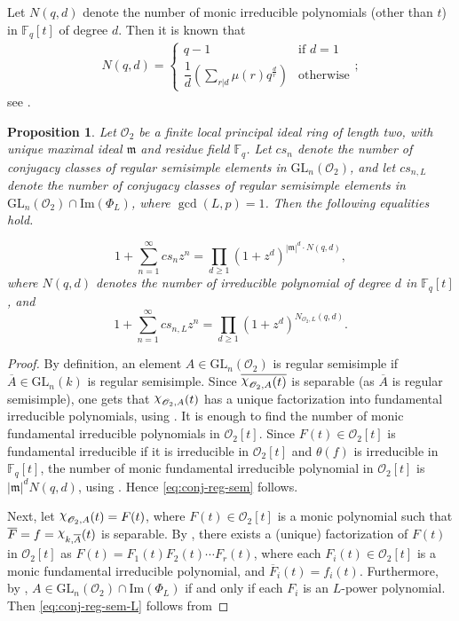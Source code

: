 \documentclass[11pt,twoside]{amsart}
\newcommand{\GL}{\mathrm{GL}}
\newcommand{\im}{\mathrm{Im}}
\newcommand{\upchi}{\raisebox{0.4ex}{$\chi$}}
\newcommand{\Char}{\upchi}
\newcommand{\R}{\mathscr{O}_2}
\newcommand{\Fq}{\mathbb{F}_q}
\newtheorem{proposition}[lemma]{Proposition}
\theoremstyle{definition} %
\begin{document}
Let $N(q,d)$ denote the number of monic irreducible polynomials (other than $t$) in $\Fq[t]$ of degree $d$. 
Then it is known that
\begin{align*}
    N(q,d)=\begin{cases}
        q-1&\text{if }d=1\\
        \dfrac{1}{d}\left(\sum\limits_{r|d}\mu(r)q^{\frac{d}{r}}\right)&\text{otherwise}
    \end{cases};
\end{align*}
see \cite[Lemma 1.3.10]{FulmanNeumannPraeger2005}.
\begin{proposition}\label{prop:gen-func-reg-sem-class}
    Let $\R$ be a finite local principal ideal ring of length two, with unique maximal ideal $\mathfrak{m}$ and residue field $\mathbb{F}_q$.  
Let $cs_n$ denote the number of conjugacy classes of regular semisimple elements in $\GL_n(\R)$, and let $cs_{n,L}$ denote the number of conjugacy classes of regular semisimple elements in $\GL_n(\R) \cap \im(\Phi_L)$, where $\gcd(L,p)=1$.  
Then the following equalities hold.

    \begin{equation}\label{eq:conj-reg-sem}
    1+\sum\limits_{n=1}^{\infty}cs_nz^n=\prod\limits_{d\geq 1} (1+z^d)^{|\mathfrak{m}|^d\cdot N(q,d)},
    \end{equation}
    where $N(q,d)$ denotes the number of irreducible polynomial of degree $d$ in $\Fq[t]$, and
    \begin{equation}\label{eq:conj-reg-sem-L}
   1+\sum\limits_{n=1}^{\infty}cs_{n,L}z^n=\prod\limits_{d\geq 1}(1+z^d)^{N_{\R,L}(q,d)}.
    \end{equation}
\end{proposition}
\begin{proof}
By definition, an element $A\in\GL_n(\R)$ is regular semisimple if $\overline{A}\in\GL_n(k)$ is regular semisimple.
Since $\overline{\Char_{\R,A}(t)}$ is separable (as $\overline{A}$ is regular semisimple), one gets that ${\Char_{\R,A}(t)}$ has a unique factorization into fundamental irreducible polynomials, using . 
It is enough to find the number of monic fundamental irreducible polynomials in $\R[t]$. 
Since $F(t)\in\R[t]$ is fundamental irreducible if it is irreducible in $\R[t]$ and $\theta(f)$ is irreducible in $\Fq[t]$, the number of monic fundamental irreducible polynomial in $\R[t]$ is $|\mathfrak{m}|^dN(q,d)$, using .
Hence \cref{eq:conj-reg-sem} follows.

Next, let $\Char_{\R,{A}}(t)=F(t)$, where $F(t)\in \R[t]$ is a monic polynomial such that $\overline{F}=f=\Char_{{k},\overline{A}}(t)$ is separable.
By , there exists a (unique) factorization of $F(t)$ in $\R[t]$ as $F(t)=F_1(t)F_2(t)\cdots F_r(t)$, where each $F_i(t)\in\R[t]$ is a monic fundamental irreducible polynomial, and $\overline{F}_i(t)=f_i(t)$. 
Furthermore, by , $A\in\GL_n(\R)\cap\im(\Phi_L)$ if and only if each $F_i$ is an $L$-power polynomial. 
Then \cref{eq:conj-reg-sem-L} follows from 
\end{proof}
\end{document}
